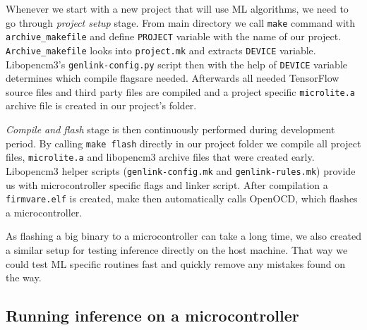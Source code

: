 Whenever we start with a new project that will use ML algorithms, we need to go through \textit{project setup} stage.
From main directory we call \verb|make| command with \verb|archive_makefile| and define \verb|PROJECT| variable with the name of our project.
\verb|Archive_makefile| looks into \verb|project.mk| and extracts \verb|DEVICE| variable.
Libopencm3's \verb|genlink-config.py| script then with the help of \verb|DEVICE| variable determines which compile flags\footnotemark are needed. 
Afterwards all needed TensorFlow source files and third party files are compiled and a project specific \verb|microlite.a| archive file is created in our project's folder.

\textit{Compile and flash} stage is then continuously performed during development period.
By calling \verb|make flash| directly in our project folder we compile all project files, \verb|microlite.a| and libopencm3 archive files that were created early.
Libopencm3 helper scripts (\verb|genlink-config.mk| and \verb|genlink-rules.mk|) provide us with microcontroller specific flags and linker script.
After compilation a \verb|firmvare.elf| is created, make then automatically calls OpenOCD, which flashes a microcontroller.

As flashing a big binary to a microcontroller can take a long time, we also created a similar setup for testing inference directly on the host machine.
That way we could test ML specific routines fast and quickly remove any mistakes found on the way.


\subsection{ Running inference on a microcontroller}

